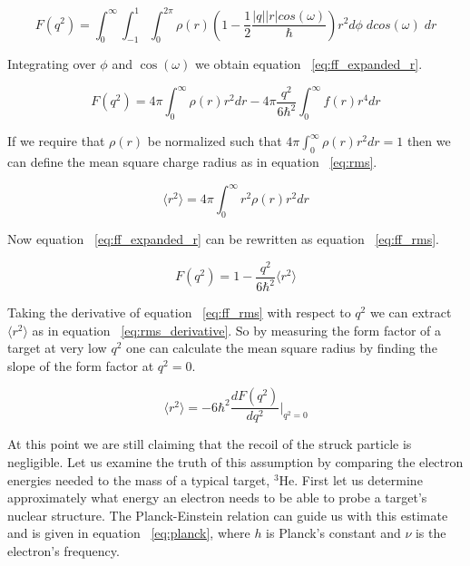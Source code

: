 \begin{equation} \label{eq:ff_expanded}
	F(q^2) = \int_0^\infty \int_{-1}^1 \int_0^{2\pi} \rho(r) \left( 1-\frac{1}{2} \frac{|q||r|cos(\omega)}{\hbar} \right) r^2 d\phi \; dcos(\omega) \; dr
\end{equation}

\noindent Integrating over $\phi$ and $\cos(\omega)$ we obtain equation ~\ref{eq:ff_expanded_r}.

\begin{equation} \label{eq:ff_expanded_r}
	F(q^2) = 4\pi \int_0^\infty \rho(r) r^2 dr - 4\pi \frac{q^2}{6\hbar^2} \int_0^\infty f(r) r^4 dr
\end{equation}

If we require that $\rho(r)$ be normalized such that $4\pi \int_0^\infty \rho(r) r^2 dr = 1$ then we can define the mean square charge radius as in equation ~\ref{eq:rms}.

\begin{equation} \label{eq:rms}
	\langle r^2 \rangle = 4\pi \int_0^\infty r^2 \rho(r) r^2 dr
\end{equation}

\noindent Now equation ~\ref{eq:ff_expanded_r} can be rewritten as equation ~\ref{eq:ff_rms}.

\begin{equation} \label{eq:ff_rms}
	F(q^2) = 1 - \frac{q^2}{6\hbar^2} \langle r^2 \rangle
\end{equation}

\noindent Taking the derivative of equation ~\ref{eq:ff_rms} with respect to $q^2$ we can extract $\langle r^2 \rangle$ as in equation ~\ref{eq:rms_derivative}. So by measuring the form factor of a target at very low $q^2$ one can calculate the mean square radius by finding the slope of the form factor at $q^2=0$.

\begin{equation} \label{eq:rms_derivative}
	\langle r^2 \rangle = -6\hbar^2 \frac{dF(q^2)}{dq^2} |_{q^2=0}
\end{equation}

At this point we are still claiming that the recoil of the struck particle is negligible. Let us examine the truth of this assumption by comparing the electron energies needed to the mass of a typical target, $^3$He. First let us determine approximately what energy an electron needs to be able to probe a target's nuclear structure. The Planck-Einstein relation can guide us with this estimate and is given in equation ~\ref{eq:planck}, where $h$ is Planck's constant and $\nu$ is the electron's frequency. 

